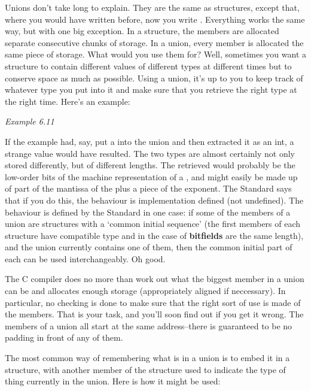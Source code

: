   

  Unions don't take long to explain. They are the same as structures, except
   that, where you would have written \struct{} before, now you write
   \union. Everything works the same way, but with one big
   exception. In a structure, the members are allocated separate consecutive
   chunks of storage. In a union, every member is allocated the same piece of
   storage. What would you use them for? Well, sometimes you want a structure
   to contain different values of different types at different times but to
   conserve space as much as possible. Using a union, it's up to you to keep
   track of whatever type you put into it and make sure that you retrieve the
   right type at the right time. Here's an example:


   \begin{center}\textit{Example 6.11}\end{center}


  If the example had, say, put a \float{} into the union and then
   extracted it as an int, a strange value would have resulted. The two types
   are almost certainly not only stored differently, but of different lengths.
   The \kint{} retrieved would probably be the low-order bits of the
   machine representation of a \float, and might easily be made up
   of part of the mantissa of the \float{} plus a piece of the
   exponent. The Standard says that if you do this, the behaviour is
   implementation defined (not undefined). The behaviour is defined by the
   Standard in one case: if some of the members of a union are structures with
   a `common initial sequence' (the first members of each structure have
   compatible type and in the case of \textbf{bitfields} are the same
   length), and the union currently contains one of them, then the common
   initial part of each can be used interchangeably. Oh good.


  The C compiler does no more than work out what the biggest member in
   a union can be and allocates enough storage (appropriately aligned if
   neccessary). In particular, no checking is done to make sure that the right
   sort of use is made of the members. That is your task, and you'll soon find
   out if you get it wrong. The members of a union all start at the same
   address--there is guaranteed to be no padding in front of any of
   them.


  The most common way of remembering what is in a union is to embed it in
   a structure, with another member of the structure used to indicate the type
   of thing currently in the union. Here is how it might be used:



